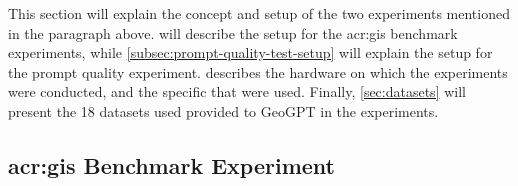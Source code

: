
This section will explain the concept and setup of the two experiments mentioned in the paragraph above.  will describe the setup for the \acrshort{acr:gis} benchmark experiments, while \autoref{subsec:prompt-quality-test-setup} will explain the setup for the prompt quality experiment.  describes the hardware on which the experiments were conducted, and the specific  that were used. Finally, \autoref{sec:datasets} will present the 18 datasets used provided to GeoGPT in the experiments.

\subsection[GIS Benchmark Experiment]{\acrshort{acr:gis} Benchmark Experiment}
\label{subsec:benchmarking-setup}


